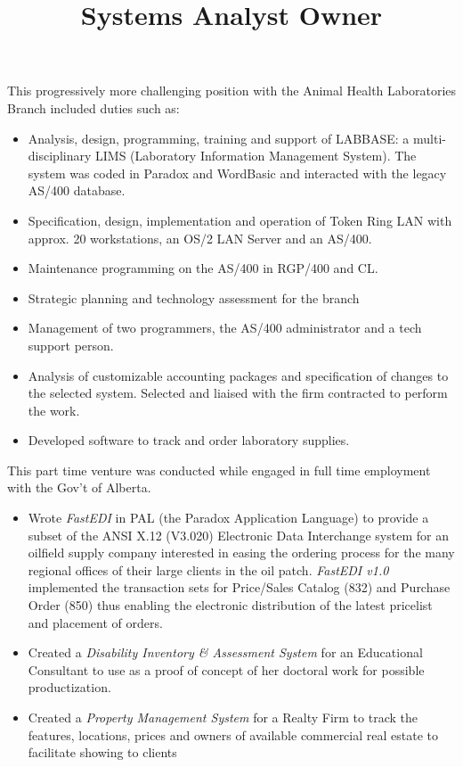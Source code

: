 \begin{resume}
\begin{position}
\end{position}



\title{Systems Analyst}
\begin{position}
This progressively more challenging position with the Animal Health
Laboratories Branch included duties such as:
\begin{itemize}
\item Analysis, design, programming, training and support of LABBASE: 
        a multi-disciplinary LIMS (Laboratory Information Management System).  
	The system was coded in Paradox and WordBasic and
	interacted with the legacy AS/400 database.
\item Specification, design, implementation and operation of Token Ring LAN 
	with approx. 20 workstations, an OS/2 LAN Server and an AS/400.  
\item Maintenance programming on the AS/400 in RGP/400 and CL.  
\item Strategic planning and technology assessment for the branch 
\item Management of two programmers, the AS/400 administrator and a
	 tech support person.
\item Analysis of customizable accounting packages and specification 
	of changes to the selected system. Selected and liaised with 
	the firm contracted to perform the work.
\item Developed software to track and order laboratory supplies.
\end{itemize}
\end{position}


\title{ Owner }
\begin{position}
This part time venture was conducted while engaged in full time employment 
with the Gov't of Alberta.
\begin{itemize}
\item Wrote {\it FastEDI} in PAL (the Paradox Application Language)  to 
	provide a subset of the 
	ANSI X.12 (V3.020) Electronic Data Interchange system for an 
	oilfield supply company interested in easing the ordering process for
	the many regional offices of their large clients in the oil patch.  
	{\it FastEDI v1.0} implemented 
	the transaction sets for Price/Sales Catalog (832) and
	Purchase Order (850) thus enabling the electronic distribution 
	of the latest pricelist and placement of orders.
\item Created a {\it Disability Inventory \& Assessment System }
	for an Educational Consultant to use as a proof of concept of
	her doctoral work for possible productization.
\item Created a {\it Property Management System} for a Realty Firm to
	track the features, locations, prices and owners of 
	available commercial real estate to facilitate showing to clients
\end{itemize}
\end{position}



\end{resume}
